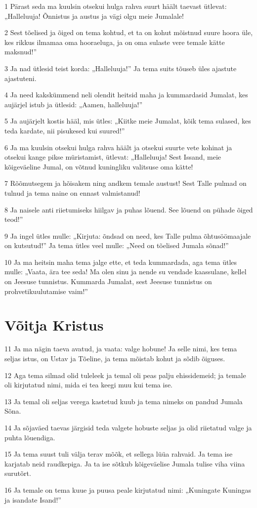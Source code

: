 \par 1 Pärast seda ma kuulsin otsekui hulga rahva suurt häält taevast ütlevat: „Halleluuja! Õnnistus ja austus ja vägi olgu meie Jumalale!
\par 2 Sest tõelised ja õiged on tema kohtud, et ta on kohut mõistnud suure hoora üle, kes rikkus ilmamaa oma hooraeluga, ja on oma sulaste vere temale kätte maksnud!”
\par 3 Ja nad ütlesid teist korda: „Halleluuja!” Ja tema suits tõuseb üles ajastute ajastuteni.
\par 4 Ja need kakskümmend neli olendit heitsid maha ja kummardasid Jumalat, kes aujärjel istub ja ütlesid: „Aamen, halleluuja!”
\par 5 Ja aujärjelt kostis hääl, mis ütles: „Kiitke meie Jumalat, kõik tema sulased, kes teda kardate, nii pisukesed kui suured!”
\par 6 Ja ma kuulsin otsekui hulga rahva häält ja otsekui suurte vete kohinat ja otsekui kange pikse müristamist, ütlevat: „Halleluuja! Sest Issand, meie kõigeväeline Jumal, on võtnud kuningliku valitsuse oma kätte!
\par 7 Rõõmutsegem ja hõisakem ning andkem temale austust! Sest Talle pulmad on tulnud ja tema naine on ennast valmistanud!
\par 8 Ja naisele anti riietumiseks hiilgav ja puhas lõuend. See lõuend on pühade õiged teod!”
\par 9 Ja ingel ütles mulle: „Kirjuta: õndsad on need, kes Talle pulma õhtusöömaajale on kutsutud!” Ja tema ütles veel mulle: „Need on tõelised Jumala sõnad!”
\par 10 Ja ma heitsin maha tema jalge ette, et teda kummardada, aga tema ütles mulle: „Vaata, ära tee seda! Ma olen sinu ja nende su vendade kaassulane, kellel on Jeesuse tunnistus. Kummarda Jumalat, sest Jeesuse tunnistus on prohvetikuulutamise vaim!”

\section*{Võitja Kristus}

\par 11 Ja ma nägin taeva avatud, ja vaata: valge hobune! Ja selle nimi, kes tema seljas istus, on Ustav ja Tõeline, ja tema mõistab kohut ja sõdib õiguses.
\par 12 Aga tema silmad olid tuleleek ja temal oli peas palju ehissidemeid; ja temale oli kirjutatud nimi, mida ei tea keegi muu kui tema ise.
\par 13 Ja temal oli seljas verega kastetud kuub ja tema nimeks on pandud Jumala Sõna.
\par 14 Ja sõjaväed taevas järgisid teda valgete hobuste seljas ja olid riietatud valge ja puhta lõuendiga.
\par 15 Ja tema suust tuli välja terav mõõk, et sellega lüüa rahvaid. Ja tema ise karjatab neid raudkepiga. Ja ta ise sõtkub kõigeväelise Jumala tulise viha viina surutõrt.
\par 16 Ja temale on tema kuue ja puusa peale kirjutatud nimi: „Kuningate Kuningas ja isandate Isand!”

